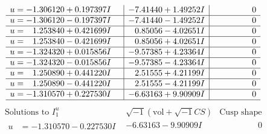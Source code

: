 \documentclass[1p]{elsarticle_modified}
\theoremstyle{definition}
\newcommand{\I}{\sqrt{-1}}
\begin{document}
$$\begin{array}{c|c|c}
\begin{aligned}
u &= -1.306120 + 0.197397 I\end{aligned}
 & -7.41440 + 1.49252 I & \phantom{-0.000000 } 0 \\ \hline\begin{aligned}
u &= -1.306120 - 0.197397 I\end{aligned}
 & -7.41440 - 1.49252 I & \phantom{-0.000000 } 0 \\ \hline\begin{aligned}
u &= \phantom{-}1.253840 + 0.421699 I\end{aligned}
 & \phantom{-}0.85056 - 4.02651 I & \phantom{-0.000000 } 0 \\ \hline\begin{aligned}
u &= \phantom{-}1.253840 - 0.421699 I\end{aligned}
 & \phantom{-}0.85056 + 4.02651 I & \phantom{-0.000000 } 0 \\ \hline\begin{aligned}
u &= -1.324320 + 0.015856 I\end{aligned}
 & -9.57385 + 4.23364 I & \phantom{-0.000000 } 0 \\ \hline\begin{aligned}
u &= -1.324320 - 0.015856 I\end{aligned}
 & -9.57385 - 4.23364 I & \phantom{-0.000000 } 0 \\ \hline\begin{aligned}
u &= \phantom{-}1.250890 + 0.441220 I\end{aligned}
 & \phantom{-}2.51555 + 4.21199 I & \phantom{-0.000000 } 0 \\ \hline\begin{aligned}
u &= \phantom{-}1.250890 - 0.441220 I\end{aligned}
 & \phantom{-}2.51555 - 4.21199 I & \phantom{-0.000000 } 0 \\ \hline\begin{aligned}
u &= -1.310570 + 0.227530 I\end{aligned}
 & -6.63163 + 9.90909 I & \phantom{-0.000000 } 0\\
 \hline 
 \end{array}$$\newpage$$\begin{array}{c|c|c}  
\text{Solutions to }I^u_{1}& \I (\text{vol} + \sqrt{-1}CS) & \text{Cusp shape}\\
 \hline 
\begin{aligned}
u &= -1.310570 - 0.227530 I\end{aligned}
 & -6.63163 - 9.90909 I & \phantom{-0.000000 } 0 \\ \hline\begin{aligned}

\end{aligned}
\end{array}$$
\end{document}
